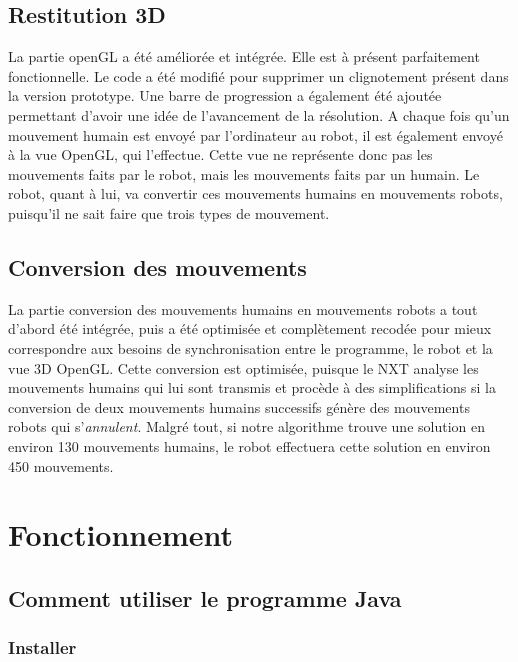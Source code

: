 \documentclass[a4paper,12pt]{article}
\begin{document}
\subsection{Restitution 3D} 

La partie openGL a été améliorée et intégrée. Elle est à présent parfaitement fonctionnelle. Le code a été modifié pour supprimer un clignotement présent dans la version prototype. Une barre de progression a également été ajoutée permettant d'avoir une idée de l'avancement de la résolution. A chaque fois qu'un mouvement humain est envoyé par l'ordinateur au robot, il est également envoyé à la vue OpenGL, qui l'effectue. Cette vue ne représente donc pas les mouvements faits par le robot, mais les mouvements faits par un humain. Le robot, quant à lui, va convertir ces mouvements humains en mouvements robots, puisqu'il ne sait faire que trois types de mouvement.

\subsection{Conversion des mouvements}

La partie conversion des mouvements humains en mouvements robots a tout d'abord été intégrée, puis a été optimisée et complètement recodée pour mieux correspondre aux besoins de synchronisation entre le programme, le robot et la vue 3D OpenGL. Cette conversion est optimisée, puisque le NXT analyse les mouvements humains qui lui sont transmis et procède à des simplifications si la conversion de deux mouvements humains successifs génère des mouvements robots qui s'\textit{annulent}. Malgré tout, si notre algorithme trouve une solution en environ 130 mouvements humains, le robot effectuera cette solution en environ 450 mouvements.







\section{Fonctionnement}


\subsection{Comment utiliser le programme Java}

\subsubsection{Installer}
\end{document}
